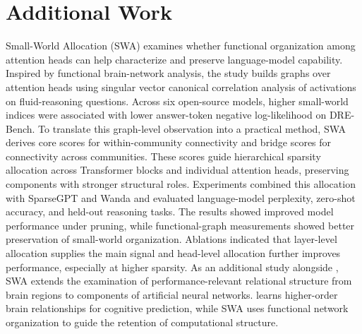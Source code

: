 \FloatBarrier
\section{Additional Work}
\label{sec:hybrid-additional-work}

Small-World Allocation (SWA) examines whether functional organization among attention heads can help characterize and preserve language-model capability. Inspired by functional brain-network analysis, the study builds graphs over attention heads using singular vector canonical correlation analysis of activations on fluid-reasoning questions. Across six open-source models, higher small-world indices were associated with lower answer-token negative log-likelihood on DRE-Bench. To translate this graph-level observation into a practical method, SWA derives core scores for within-community connectivity and bridge scores for connectivity across communities. These scores guide hierarchical sparsity allocation across Transformer blocks and individual attention heads, preserving components with stronger structural roles. Experiments combined this allocation with SparseGPT and Wanda and evaluated language-model perplexity, zero-shot accuracy, and held-out reasoning tasks. The results showed improved model performance under pruning, while functional-graph measurements showed better preservation of small-world organization. Ablations indicated that layer-level allocation supplies the main signal and head-level allocation further improves performance, especially at higher sparsity. As an additional study alongside \hybrid{}, SWA extends the examination of performance-relevant relational structure from brain regions to components of artificial neural networks. \hybrid{} learns higher-order brain relationships for cognitive prediction, while SWA uses functional network organization to guide the retention of computational structure.
